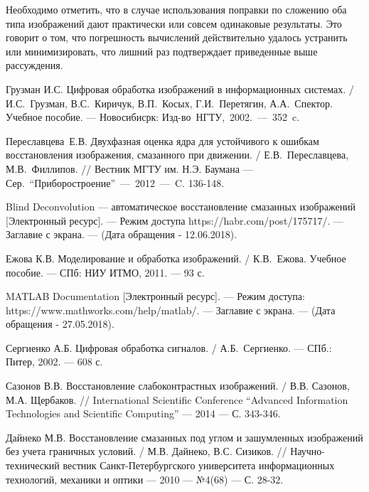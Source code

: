 \documentclass[a4paper]{article}
\theoremstyle{definition}
\begin{document}
Необходимо отметить, что в случае использования поправки по сложению оба типа изображений дают практически или совсем одинаковые результаты. Это говорит о том, что погрешность вычислений действительно удалось устранить или минимизировать, что лишний раз подтверждает приведенные выше рассуждения.



\newpage


\begin{thebibliography}{9}
Грузман И.С. Цифровая обработка изображений в информационных системах. / И.С.~Грузман, В.С.~Киричук, В.П.~Косых, Г.И.~Перетягин, А.А.~Спектор. Учебное пособие. --- Новосибисрк: Изд-во~НГТУ,~2002.~---~352~c.

Переславцева~Е.В. Двухфазная оценка ядра для устойчивого к ошибкам восстановления изображения, смазанного при движении. / Е.В.~Переславцева, М.В.~Филлипов. // Вестник МГТУ им. Н.Э. Баумана --- Сер.~``Приборостроение''~---~2012~---~C. 136-148.

Blind Deconvolution --- автоматическое восстановление смазанных изображений [Электронный ресурс]. --- Режим доступа https://habr.com/post/175717/. --- Заглавие с экрана. --- (Дата обращения - 12.06.2018).

Ежова К.В. Моделирование и обработка изображений. / К.В.~Ежова. Учебное пособие. --- СПб: НИУ ИТМО, 2011. --- 93 с.

MATLAB Documentation [Электронный ресурс]. --- Режим доступа: https://www.mathworks.com/help/matlab/. --- Заглавие с экрана. --- (Дата обращения - 27.05.2018).

Сергиенко А.Б. Цифровая обработка сигналов. / А.Б.~Сергиенко. --- СПб.: Питер, 2002. --- 608 с.

Сазонов В.В. Восстановление слабоконтрастных изображений. / В.В. Сазонов, М.А. Щербаков. // International Scientific Conference
``Advanced Information Technologies and Scientific Computing'' --- 2014 --- С. 343-346.

Дайнеко М.В. Восстановление смазанных под углом и зашумленных изображений без учета граничных условий. / М.В. Дайнеко, В.С. Сизиков. // Научно-технический вестник Санкт-Петербургского университета информационных технологий, механики и оптики --- 2010 --- №4(68) --- С. 28-32.

\end{thebibliography}
\end{document}
